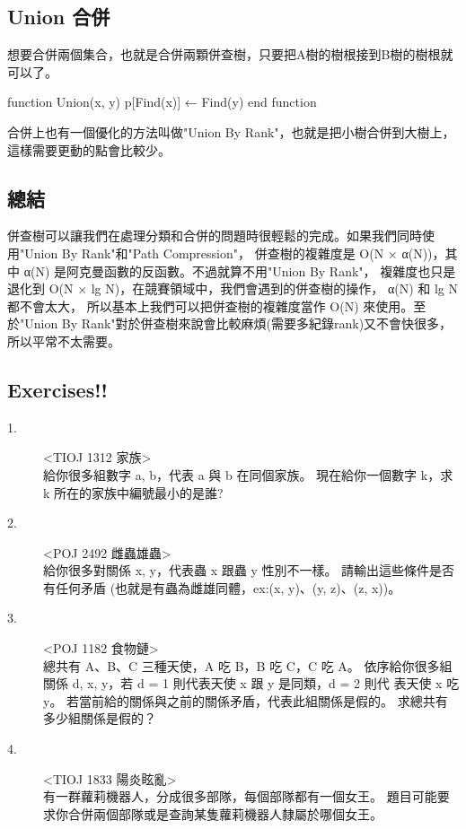 \documentclass{article}
\begin{document}
\subsection{Union 合併}
想要合併兩個集合，也就是合併兩顆併查樹，只要把A樹的樹根接到B樹的樹根就可以了。

\begin{algorithm}[caption={Union}, label={alg1}]
function Union(x, y)
    p[Find(x)] ← Find(y)
end function
\end{algorithm}

合併上也有一個優化的方法叫做"Union By Rank"，也就是把小樹合併到大樹上，這樣需要更動的點會比較少。\\

\subsection{總結}
併查樹可以讓我們在處理分類和合併的問題時很輕鬆的完成。如果我們同時使用"Union By Rank"和"Path Compression"，
併查樹的複雜度是 O(N × α(N))，其中 α(N) 是阿克曼函數的反函數。不過就算不用"Union By Rank"，
複雜度也只是退化到 O(N × lg N)，在競賽領域中，我們會遇到的併查樹的操作， α(N) 和 lg N 都不會太大，
所以基本上我們可以把併查樹的複雜度當作 O(N) 來使用。至於"Union By Rank"對於併查樹來說會比較麻煩(需要多紀錄rank)又不會快很多，所以平常不太需要。

\subsection{Exercises!!}

\begin{description}
\item[ 1.]<TIOJ 1312 家族>\\
給你很多組數字 a, b，代表 a 與 b 在同個家族。
現在給你一個數字 k，求 k 所在的家族中編號最小的是誰?
\item[ 2.]<POJ 2492 雌蟲雄蟲>\\
給你很多對關係 x, y，代表蟲 x 跟蟲 y 性別不一樣。
請輸出這些條件是否有任何矛盾 (也就是有蟲為雌雄同體，ex:(x, y)、(y, z)、(z, x))。
\item[ 3.]<POJ 1182 食物鏈>\\
總共有 A、B、C 三種天使，A 吃 B，B 吃 C，C 吃 A。
依序給你很多組關係 d, x, y，若 d = 1 則代表天使 x 跟 y 是同類，d = 2 則代
表天使 x 吃 y。
若當前給的關係與之前的關係矛盾，代表此組關係是假的。
求總共有多少組關係是假的？
\item[ 4.]<TIOJ 1833 陽炎眩亂>\\
有一群蘿莉機器人，分成很多部隊，每個部隊都有一個女王。
題目可能要求你合併兩個部隊或是查詢某隻蘿莉機器人隸屬於哪個女王。
\end{description} 
\end{document}
